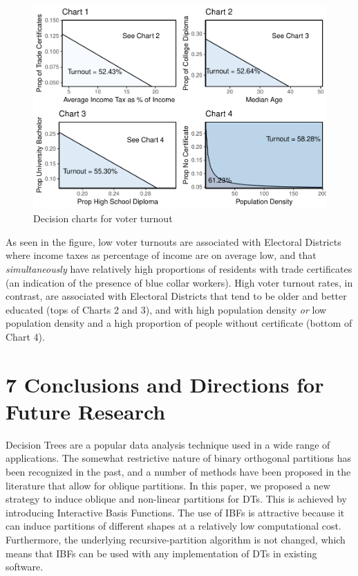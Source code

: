 \documentclass[]{elsarticle} %
\makeatletter
\def\maxwidth{\ifdim\Gin@nat@width>\linewidth\linewidth
\else\Gin@nat@width\fi}
\let\Oldincludegraphics\includegraphics
\renewcommand{\includegraphics}[1]{\Oldincludegraphics[width=\maxwidth]{#1}}
\makeatother
\begin{document}
\begin{figure}[htbp]
\centering
\includegraphics{Trees_with_Base_Functions_v2_files/figure-latex/fig28-election-decision-charts-1.pdf}
\caption{\label{fig:fig28-election-decision-charts}Decision charts for
voter turnout}
\end{figure}

As seen in the figure, low voter turnouts are associated with Electoral
Districts where income taxes as percentage of income are on average low,
and that \emph{simultaneously} have relatively high proportions of
residents with trade certificates (an indication of the presence of blue
collar workers). High voter turnout rates, in contrast, are associated
with Electoral Districts that tend to be older and better educated (tops
of Charts 2 and 3), and with high population density \emph{or} low
population density and a high proportion of people without certificate
(bottom of Chart 4).

\section{7 Conclusions and Directions for Future
Research}\label{conclusions-and-directions-for-future-research}

Decision Trees are a popular data analysis technique used in a wide
range of applications. The somewhat restrictive nature of binary
orthogonal partitions has been recognized in the past, and a number of
methods have been proposed in the literature that allow for oblique
partitions. In this paper, we proposed a new strategy to induce oblique
and non-linear partitions for DTs. This is achieved by introducing
Interactive Basis Functions. The use of IBFs is attractive because it
can induce partitions of different shapes at a relatively low
computational cost. Furthermore, the underlying recursive-partition
algorithm is not changed, which means that IBFs can be used with any
implementation of DTs in existing software.
\end{document}
